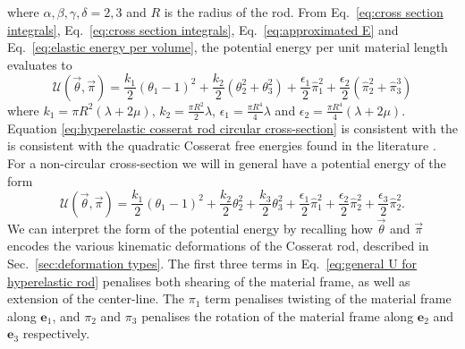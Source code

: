 where $\alpha,\beta,\gamma,\delta=2,3$ and $R$ is the radius of
the rod. From Eq.~\ref{eq:cross section integrals}, Eq.~\ref{eq:cross section integrals}, Eq.~\ref{eq:approximated E} and Eq.~\ref{eq:elastic energy per volume}, the potential energy per unit material length evaluates to
\begin{equation} \label{eq:hyperelastic cosserat rod circular cross-section}
\mathcal{U}(\vec{\theta}, \vec{\pi})=\frac{k_{1}}{2}(\theta_{1}-1)^{2}+\frac{k_2}{2}(\theta_{2}^{2}+\theta_{3}^{2})+\frac{\epsilon_1}{2}\hat{\pi}_{1}^{2}+\frac{\epsilon_2}{2}(\hat{\pi}_{2}^{2}+\hat{\pi}_{3}^{3})
\end{equation}
where $k_1=\pi R^{2}(\lambda+2\mu)$, $k_2=\frac{\pi R^{2}}{2}\lambda$, $\epsilon_1=\frac{\pi R^{4}}{4}\lambda$ and $\epsilon_2=\frac{\pi R^{4}}{4}(\lambda+2\mu)$. Equation \ref{eq:hyperelastic cosserat rod circular cross-section} is consistent with the is consistent with the quadratic Cosserat free energies found in the literature \citep{giusteriSimulationViscoelasticCosserat2021, caoNonlinearDynamicsElastic2008, rubinCosseratRods2000}. For a non-circular cross-section we will in general have a potential energy of the form
\begin{equation} \label{eq:general U for hyperelastic rod}
\mathcal{U}(\vec{\theta}, \vec{\pi})=\frac{k_1}{2}(\theta_{1}-1)^{2}+\frac{k_{2}}{2}\theta_{2}^{2}+\frac{k_{3}}{2}\theta_{3}^{2}+\frac{\epsilon_1}{2}\hat{\pi}_{1}^{2}+\frac{\epsilon_{2}}{2}\hat{\pi}_{2}^{2}+\frac{\epsilon_{3}}{2}\hat{\pi}_{2}^{2}.
\end{equation}
We can interpret the form of the potential energy by recalling how $\vec{\theta}$ and $\vec{\pi}$ encodes the various kinematic deformations of the Cosserat rod, described in Sec.~\ref{sec:deformation types}. The first three terms in Eq.~\ref{eq:general U for hyperelastic rod} penalises both shearing of the material frame, as well as extension of the center-line. The $\pi_1$ term penalises twisting of the material frame along $\mathbf{e}_1$, and $\pi_2$ and $\pi_3$ penalises the rotation of the material frame along $\mathbf{e}_2$ and $\mathbf{e}_3$ respectively.

